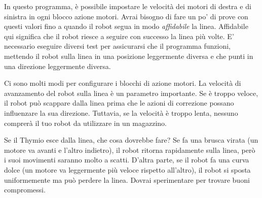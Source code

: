 In questo programma, è possibile impostare le velocità dei
motori di destra e di sinistra in ogni blocco azione motori. Avrai bisogno di
fare un po' di prove con questi valori fino a quando il robot segua in modo \emph{affidabile} la linea. Affidabile qui
significa che il robot riesce a seguire con successo la linea più volte.
E' necessario eseguire
diversi test per assicurarsi che il programma funzioni, mettendo il robot sulla linea in una posizione leggermente diversa e
che punti in una direzione leggermente diversa.

Ci sono molti modi per configurare i blocchi di azione motori.
La velocità di avanzamento del robot sulla linea è un parametro importante.
Se è troppo veloce, il robot può scappare dalla linea prima che le azioni di correzione possano influenzare la sua direzione. Tuttavia, se la velocità è troppo lenta, nessuno comprerà il tuo robot da utilizzare in un magazzino.

Se il Thymio esce dalla linea, che cosa dovrebbe fare?
Se fa una brusca virata (un motore va avanti e l'altro indietro),
il robot ritorna rapidamente sulla linea, però i suoi movimenti saranno molto a scatti.
D'altra parte, se il robot fa una curva dolce (un motore va leggermente più veloce rispetto all'altro), il robot si sposta uniformemente ma può perdere la linea.
Dovrai sperimentare per trovare buoni compromessi.

\newpage


\vfill


\vfill


